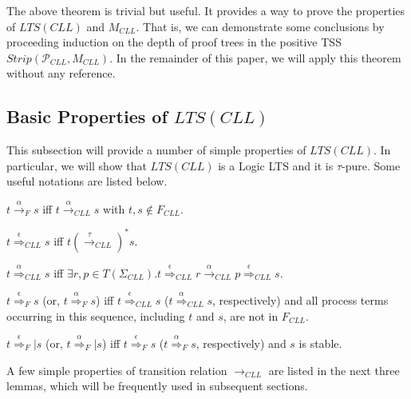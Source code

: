 \documentclass{elsarticle}
\theoremstyle{plain}
\theoremstyle{definition}
\begin{document}
The above theorem is trivial but useful. It provides a way to prove the properties of $LTS(CLL)$ and $M_{CLL}$. That is, we can demonstrate some conclusions by proceeding induction on the depth of proof trees in the positive TSS $Strip({\mathcal P}_{CLL},M_{CLL})$.  In the remainder of this paper, we will apply this theorem without any reference.

\subsection{Basic Properties of $LTS({CLL})$}

This subsection will provide a number of simple properties of $LTS({CLL})$. In particular, we will show that $LTS({CLL})$ is a Logic LTS and it is $\tau$-pure.
Some useful notations are listed below.

$t \stackrel{\alpha}{\longrightarrow}_F s$ iff $t \stackrel{\alpha}{\longrightarrow}_{CLL} s$ with $t,s\notin F_{CLL}$.

$t \stackrel{\epsilon}{\Longrightarrow}_{CLL}s$ iff $t (\stackrel{\tau}{\longrightarrow}_{CLL})^* s$.

$t \stackrel{\alpha}{\Longrightarrow}_{CLL}s $ iff $\exists r,p\in T(\Sigma_{CLL}).t \stackrel{\epsilon}{\Longrightarrow}_{CLL} r \stackrel{\alpha}{\longrightarrow}_{CLL}p \stackrel{\epsilon}{\Longrightarrow}_{CLL} s$.

$t \stackrel{\epsilon}{\Longrightarrow}_F s$ (or, $t \stackrel{\alpha}{\Longrightarrow}_F s$) iff  $t \stackrel{\epsilon}{\Longrightarrow}_{CLL}s$ ($t \stackrel{\alpha}{\Longrightarrow}_{CLL}s$, respectively) and all process terms  occurring in this sequence, including $t$ and $s$, are not in $F_{CLL}$.

$t \stackrel{\epsilon}{\Longrightarrow}_F|s$ (or, $t \stackrel{\alpha}{\Longrightarrow}_F|s$) iff $t \stackrel{\epsilon}{\Longrightarrow}_F s$ ($t \stackrel{\alpha}{\Longrightarrow}_F s$, respectively) and $s$ is stable.

A few simple properties of transition relation $\longrightarrow_{CLL}$ are listed in the next three lemmas, which will be frequently used in subsequent sections.
\end{document}
